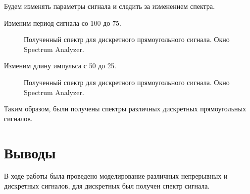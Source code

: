 \documentclass[a4paper,14pt]{extarticle}
\begin{document}
Будем изменять параметры сигнала и следить за изменением спектра.

Изменим период сигнала со 100 до 75.

\begin{figure}[H]
\caption{Полученный спектр для дискретного прямоугольного сигнала. Окно Spectrum Analyzer.}
\label{012}
\end{figure}

Изменим длину импульса с 50 до 25.

\begin{figure}[H]
\caption{Полученный спектр для дискретного прямоугольного сигнала. Окно Spectrum Analyzer.}
\label{013}
\end{figure}

Таким образом, были получены спектры различных дискретных прямоугольных сигналов.

\section{Выводы}

В ходе работы была проведено моделирование различных непрерывных и дискретных сигналов, для дискретных был получен спектр сигнала.
\end{document}
